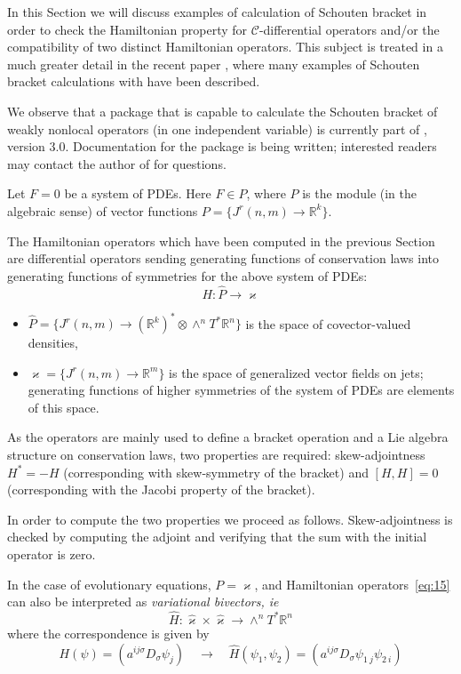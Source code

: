 In this Section we will discuss examples of calculation of Schouten bracket in
order to check the Hamiltonian property for $\mathcal{C}$-differential
operators and/or the compatibility of two distinct Hamiltonian operators. This
subject is treated in a much greater detail in the recent paper
\cite{Vitolo2019}, where many examples of Schouten bracket calculations with
\cde have been described.

We observe that a package that is capable to calculate the Schouten bracket of
weakly nonlocal operators (in one independent variable) is currently part of
\cde, version 3.0. Documentation for the package is being written; interested
readers may contact the author of \cde for questions.

Let $F=0$ be a system of PDEs. Here $F\in P$, where $P$ is the module (in the
algebraic sense) of vector functions $P=\{J^r(n,m) \to \mathbb{R}^k\}$.

The Hamiltonian operators which have been computed in the previous Section are
differential operators sending generating functions of conservation laws into
generating functions of symmetries for the above system of PDEs:
\begin{equation}
  \label{eq:15}
  H\colon \hat P \to \varkappa
\end{equation}
\begin{itemize}
  \item $\hat P=\{J^r(n,m) \to (\mathbb{R}^k)^*\otimes\wedge^n
    T^*\mathbb{R}^n\}$ is the space of covector-valued densities,
  \item $\varkappa=\{J^r(n,m) \to \mathbb{R}^m\}$ is the space of generalized
    vector fields on jets; generating functions of higher symmetries of the
    system of PDEs are elements of this space.
  \end{itemize}
As the operators are mainly used to define a bracket operation and a Lie
algebra structure on conservation laws, two properties are required:
skew-adjointness $H^* = -H$ (corresponding with skew-symmetry of the bracket)
and $[H,H]=0$ (corresponding with the Jacobi property of the bracket).

In order to compute the two properties we proceed as follows.  Skew-adjointness
is checked by computing the adjoint and verifying that the sum with the initial
operator is zero.

In the case of evolutionary equations, $P=\varkappa$, and Hamiltonian
operators~\eqref{eq:15} can also be interpreted as \emph{variational bivectors,
  ie}
\begin{equation}
  \label{eq:17}
  \hat H\colon \hat\varkappa\times\hat\varkappa \to \wedge^n T^*\mathbb{R}^n
\end{equation}
where the correspondence is given by
\begin{equation}
  \label{eq:18}
  H(\psi) = (a^{ij\sigma}D_\sigma\psi_j)
  \quad \to \quad
    \hat H(\psi_1,\psi_2) = (a^{ij\sigma}D_\sigma\psi_{1\ j}\psi_{2\ i})
\end{equation}


